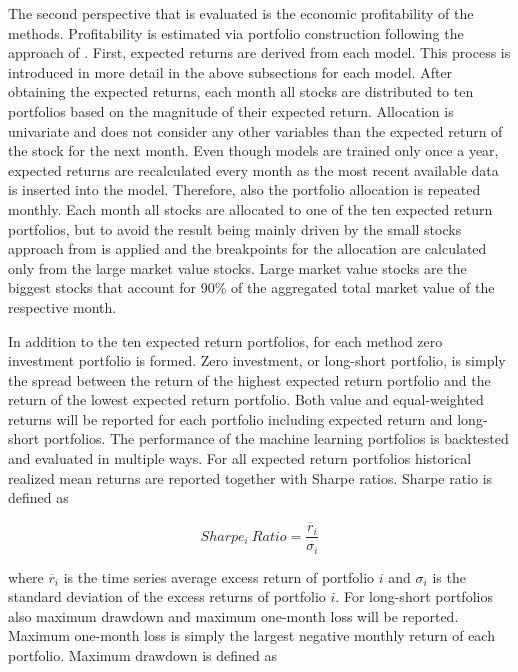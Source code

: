 \documentclass[12pt]{article}
\begin{document}
The second perspective that is evaluated is the economic profitability of the methods. Profitability is estimated via portfolio construction following the approach of \citet{Lewellen2015}.\footnotemark {} First, expected returns are derived from each model. This process is introduced in more detail in the above subsections for each model. After obtaining the expected returns, each month all stocks are distributed to ten portfolios based on the magnitude of their expected return. Allocation is univariate and does not consider any other variables than the expected return of the stock for the next month. Even though models are trained only once a year, expected returns are recalculated every month as the most recent available data is inserted into the model. Therefore, also the portfolio allocation is repeated monthly. Each month all stocks are allocated to one of the ten expected return portfolios, but to avoid the result being mainly driven by the small stocks approach from \citet{HANAUER2023} is applied and the breakpoints for the allocation are calculated only from the large market value stocks. Large market value stocks are the biggest stocks that account for 90\% of the aggregated total market value of the respective month.\footnotemark {} \par

In addition to the ten expected return portfolios, for each method zero investment portfolio is formed. Zero investment, or long-short portfolio, is simply the spread between the return of the highest expected return portfolio and the return of the lowest expected return portfolio. Both value and equal-weighted returns will be reported for each portfolio including expected return and long-short portfolios. The performance of the machine learning portfolios is backtested and evaluated in multiple ways. For all expected return portfolios historical realized mean returns are reported together with Sharpe ratios. Sharpe ratio is defined as

\begin{equation}
\label{eq:SharpeRatio}
Sharpe_i \ Ratio = \frac{\overline{r}_i}{\sigma_i}
\end{equation}

where $\overline{r}_i$ is the time series average excess return of portfolio $i$ and $\sigma_i$ is the standard deviation of the excess returns of portfolio $i$. For long-short portfolios also maximum drawdown and maximum one-month loss will be reported. Maximum one-month loss is simply the largest negative monthly return of each portfolio. Maximum drawdown is defined as \par
\end{document}
